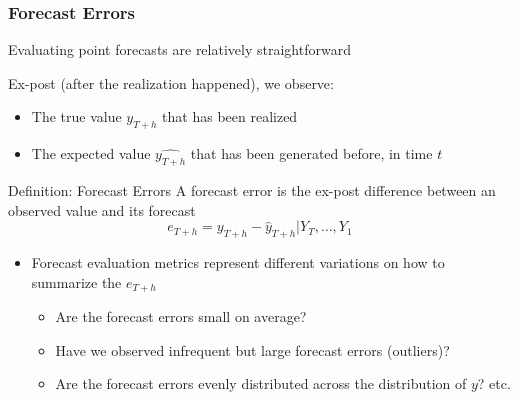 \documentclass{beamer}
\newenvironment{wideitemize}{\itemize\addtolength{\itemsep}{10pt}}{\enditemize}
\begin{document}
\begin{frame}
  \frametitle{Forecast Errors}
  \begin{wideitemize}
    \item Evaluating point forecasts are relatively straightforward
    \item Ex-post (after the realization happened), we observe:
      \begin{itemize}
      \item The true value $y_{T+h}$ that has been realized 
      \item The expected value $\hat{y_{T+h}}$ that has been generated before, in time $t$
      \end{itemize}
    \end{wideitemize}
      
  \begin{block}{Definition: Forecast Errors}
    A forecast error is the ex-post difference between an observed value and its forecast
    \begin{equation*}
      e_{T+h} = y_{T+h} - \hat{y}_{T+h}|Y_T, \dots, Y_1
    \end{equation*}
  \end{block}

  \begin{itemize}
  \item Forecast evaluation metrics represent different variations on how to summarize the $e_{T+h}$
    \begin{itemize}
    \item Are the forecast errors small on average? 
    \item Have we observed infrequent but large forecast errors (outliers)?
    \item Are the forecast errors evenly distributed across the distribution of $y$? etc.
    \end{itemize}
    
  \end{itemize}

\end{frame}
\end{document}
